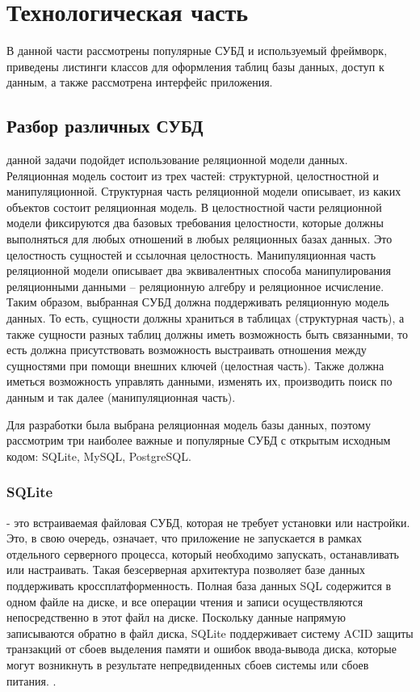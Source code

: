 \documentclass[12pt,a4paper,oneside]{report}
\begin{document}
\chapter{Технологическая часть}
\quad В данной части рассмотрены популярные СУБД и используемый фреймворк, приведены листинги классов для оформления таблиц базы данных, доступ к данным, а также рассмотрена интерфейс приложения. 

\section{Разбор различных СУБД}

 данной задачи подойдет использование реляционной модели данных. Реляционная модель состоит из трех частей: структурной, целостностной и манипуляционной. Структурная часть реляционной модели описывает, из каких объектов состоит реляционная модель. В целостностной части реляционной модели фиксируются два базовых требования целостности, которые должны выполняться для любых отношений в любых реляционных базах данных. Это целостность сущностей и ссылочная целостность. Манипуляционная часть реляционной модели описывает два эквивалентных способа манипулирования реляционными данными – реляционную алгебру и реляционное исчисление. \cite{gavr}
Таким образом, выбранная СУБД должна поддерживать реляционную модель данных. То есть, сущности должны храниться в таблицах (структурная часть), а также сущности разных таблиц должны иметь возможность быть связанными, то есть должна присутствовать возможность выстраивать отношения между сущностями при помощи внешних ключей (целостная часть). Также должна иметься возможность управлять данными, изменять их, производить поиск по данным и так далее (манипуляционная часть).

Для разработки была выбрана реляционная модель базы данных, поэтому рассмотрим три наиболее важные и популярные СУБД с открытым исходным кодом: SQLite, MySQL, PostgreSQL.

\subsection{SQLite}

\quadSQLite - это встраиваемая файловая СУБД, которая не требует установки или настройки. Это, в свою очередь, означает, что приложение не запускается в рамках отдельного серверного процесса, который необходимо запускать, останавливать или настраивать. Такая безсерверная архитектура позволяет базе данных поддерживать кроссплатформенность.
Полная база данных SQL содержится в одном файле на диске, и все операции чтения и записи осуществляются непосредственно в этот файл на диске. Поскольку данные напрямую записываются обратно в файл диска, SQLite поддерживает систему ACID защиты транзакций от сбоев выделения памяти и ошибок ввода-вывода диска, которые могут возникнуть в результате непредвиденных сбоев системы или сбоев питания.
 \cite{sqlite}.\\
\end{document}
